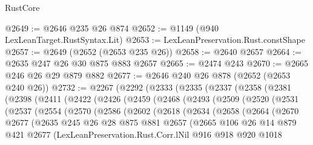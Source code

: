 \begin{lexlean}{RustCore}
\begin{coremodule}
@2649 := @2646 @235 @26 @874
@2652 := @1149 (@940 LexLeanTarget.RustSyntax.Lit)
@2653 := LexLeanPreservation.Rust.constShape
@2657 := @2649 (@2652 (@2653 @235 @26))
@2658 := @2640 @2657
@2664 := @2635 @247 @26 @30 @875 @883 @2657
@2665 := @2474 @243
@2670 := @2665 @246 @26 @29 @879 @882
@2677 := @2646 @240 @26 @878 (@2652 (@2653 @240 @26))
@2732 := @2267
    (@2292
      (@2333
        (@2335
          (@2337
            (@2358
              (@2381
                (@2398
                  (@2411
                    (@2422
                      (@2426
                        (@2459
                          (@2468
                            (@2493
                              (@2509
                                (@2520
                                  (@2531
                                    (@2537
                                      (@2554
                                        (@2570
                                          (@2586
                                            (@2602
                                              (@2618
                                                (@2634
                                                  (@2658
                                                    (@2664
                                                      (@2670
                                                        @2677
                                                        (@2635
                                                          @245
                                                          @26
                                                          @28
                                                          @875
                                                          @881
                                                          @2657
                                                          (@2665
                                                            @106
                                                            @26
                                                            @14
                                                            @879
                                                            @421
                                                            @2677
                                                            (LexLeanPreservation.Rust.Corr.lNil
                                                              @916
                                                              @918
                                                              @920
                                                              @1018

\end{coremodule}
\end{lexlean}
